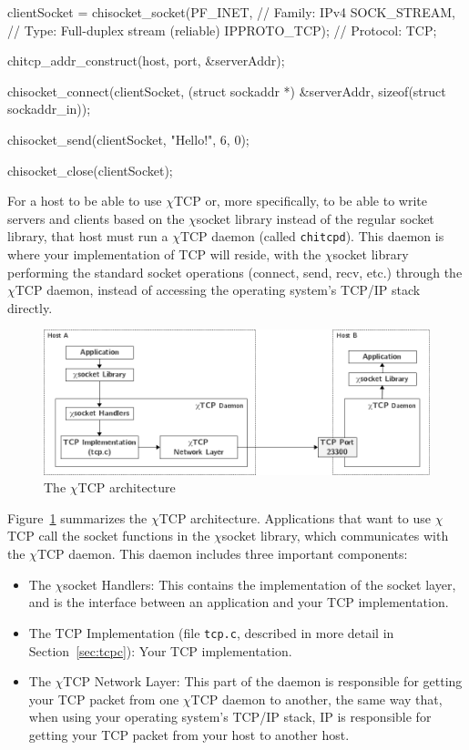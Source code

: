 \documentclass[10pt]{article}
\newcommand{\chitcp}{$\chi$\textsf{TCP} }
\newcommand{\chisocket}{$\chi$\textsf{socket} }
\newenvironment{example}%
{\VerbatimEnvironment\begin{Sbox}\begin{VerbExample}}%
{\end{VerbExample}\end{Sbox}\setlength{\fboxsep}{8pt}\begin{center}\fcolorbox{black}{backgroundgray}{\TheSbox}\end{center}}
\begin{document}
\begin{example}
clientSocket = chisocket_socket(PF_INET,       // Family: IPv4
                                SOCK_STREAM,   // Type: Full-duplex stream (reliable)
                                IPPROTO_TCP);  // Protocol: TCP;

chitcp_addr_construct(host, port, &serverAddr);

chisocket_connect(clientSocket, (struct sockaddr *) &serverAddr, sizeof(struct sockaddr_in));

chisocket_send(clientSocket, "Hello!", 6, 0);

chisocket_close(clientSocket);
\end{example}

For a host to be able to use \chitcp or, more specifically, to be able to write servers and clients based on the \chisocket library instead of the regular socket library, that host must run a \chitcp daemon (called \texttt{chitcpd}). This daemon is where your implementation of TCP will reside, with the \chisocket library performing the standard socket operations (connect, send, recv, etc.) through the \chitcp daemon, instead of accessing the operating system's TCP/IP stack directly.

\begin{figure}
\begin{center}
\includegraphics[width=1\textwidth]{architecture.png}
\caption{The \chitcp architecture}
\label{fig:architecture}
\end{center}
\end{figure}

Figure~\ref{fig:architecture} summarizes the \chitcp architecture. Applications that want to use \chitcp call the socket functions in the \chisocket library, which communicates with the \chitcp daemon. This daemon includes three important components:

\begin{itemize}
 \item The \chisocket Handlers: This contains the implementation of the socket layer, and is the interface between an application and your TCP implementation.
 \item The TCP Implementation (file \texttt{tcp.c}, described in more detail in Section~\ref{sec:tcpc}): Your TCP implementation.
 \item The \chitcp Network Layer: This part of the daemon is responsible for getting your TCP packet from one \chitcp daemon to another, the same way that, when using your operating system's TCP/IP stack, IP is responsible for getting your TCP packet from your host to another host.
\end{itemize}
\end{document}
